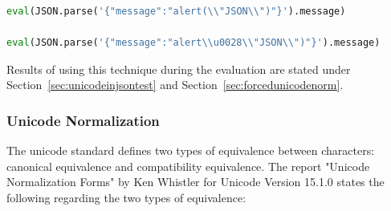 \begin{lstlisting}[style=basicStyle, language=Python]
eval(JSON.parse('{"message":"alert(\\"JSON\\")"}').message)

eval(JSON.parse('{"message":"alert\\u0028\\"JSON\\")"}').message)
\end{lstlisting}

Results of using this technique during the evaluation are stated under Section~\ref{sec:unicodeinjsontest} and Section~\ref{sec:forcedunicodenorm}.


\subsubsection{Unicode Normalization}
\label{sec:unicodenormalization}
The unicode standard defines two types of equivalence between characters: canonical equivalence and compatibility equivalence. The report "Unicode Normalization Forms" by Ken Whistler for Unicode Version 15.1.0 states the following regarding the two types of equivalence:

